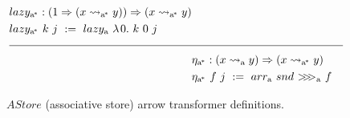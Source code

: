 \documentclass[preprint]{sigplanconf}
\newcommand{\arrow}{\rightsquigarrow}
\newcommand{\arrowarr}{\ensuremath{arr}}
\newcommand{\arrowcomp}{\ensuremath{{>}\mspace{-6mu}{>}\mspace{-6mu}{>}}}
\newcommand{\arrowlazy}{\ensuremath{lazy}}
\newcommand{\arrowtrans}{\ensuremath{\eta}}
\newcommand{\gen}{_\mathrm{a}}
\newcommand{\genc}{_\mathrm{a^{\mspace{-2mu}*}}}
\begin{document}
\begin{figure*}[!tb]
\begin{align*}
\begin{aligned}[t]
\begin{aligned}[t]
		&\arrowlazy\genc : (1 \tto (x \arrow\genc y)) \tto (x \arrow\genc y) \\
		&\arrowlazy\genc~k~j \ := \ \arrowlazy\gen~\fun{0}{k~0~j}
	\end{aligned} \\
\\[-8pt]
\hline
\\[-8pt]
	&\begin{aligned}[t]
		&\arrowtrans\genc : (x \arrow\gen y) \tto (x \arrow\genc y) \\
		&\arrowtrans\genc~f~j \ := \ \arrowarr\gen~snd~\arrowcomp\gen~f
	\end{aligned}
\end{aligned}
\end{align*}
\bottomhrule
\caption[ ]{$AStore$ (associative store) arrow transformer definitions.}
\label{fig:astore-arrow-defs}
\end{figure*}
\end{document}
